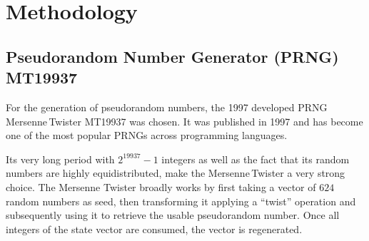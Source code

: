 \section{Methodology}

\subsection{Pseudorandom Number Generator (PRNG) MT19937}\label{ssec:methodology_rng_mt19937}

For the generation of pseudorandom numbers, the 1997 developed PRNG Mer\-sen\-ne\,Twis\-ter MT19937\cite{Makoto_Takuji} was chosen. 
It was published in 1997 and has become one of the most popular PRNGs across programming languages.\cite{educativeMersenneTwister}

Its very long period with $2^{19937}-1$ integers as well as the fact that its random numbers are highly equidistributed\cite{MT_LearnCPP}, make the Mer\-sen\-ne\,Twis\-ter a very strong choice.
The Mersenne Twister broadly works by first taking a vector of $624$ random numbers as seed, then transforming it applying a ``twist'' operation and subsequently using it to retrieve the usable pseudorandom number. 
Once all integers of the state vector are consumed, the vector is regenerated.\cite{educativeMersenneTwister}\cite{MT_DavidWong}
